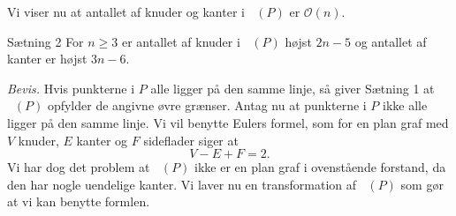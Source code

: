 \documentclass{beamer} %
\newcommand{\longpause}{\break \break \pause}
\DeclareMathOperator{\dist}{dist}
\DeclareMathOperator{\VorG}{Vor_{G}}
\begin{document}

\begin{frame}
\pause
Vi viser nu at antallet af knuder og kanter i $\VorG(P)$ er $\mathcal{O}(n)$.
\pause
\begin{block}{Sætning 2}
\pause
For $n \geq 3$ er antallet af knuder i $\VorG(P)$ højst $2n - 5$ \pause og antallet af kanter er højst $3n - 6$.
\end{block}
\pause \textit{Bevis.} \pause Hvis punkterne i $P$ alle ligger på den samme linje, så giver Sætning 1 at $\VorG(P)$ opfylder de angivne øvre grænser.
\longpause
Antag nu at punkterne i $P$ ikke alle ligger på den samme linje. \pause Vi vil benytte Eulers formel, som for en plan graf med \pause $V$ knuder, \pause $E$ kanter \pause og $F$ sideflader \pause siger at
\[
	V - E + F = 2.
\]
\pause Vi har dog det problem at $\VorG(P)$ ikke er en plan graf i ovenstående forstand, da den har nogle uendelige kanter. \pause Vi laver nu en transformation af $\VorG(P)$ som gør at vi kan benytte formlen.
\end{frame}
\end{document}
